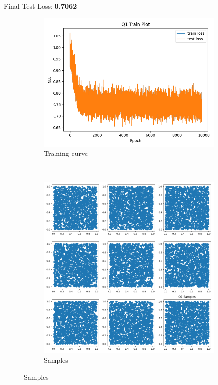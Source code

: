 \documentclass{article}
\begin{document}
Final Test Loss: \textbf{0.7062} \\
\begin{figure}[H]
    \centering
    \begin{subfigure}{0.5\textwidth}
        \centering
        \includegraphics[width=\textwidth]{figures/q1_train_plot.png}
        \caption{Training curve}
    \end{subfigure}
    \\
    \begin{subfigure}{0.5\textwidth}
        \centering
        \includegraphics[width=\textwidth]{figures/q1_samples.png}
        \caption{Samples}
    \end{subfigure}
    
\end{figure}
\end{document}

